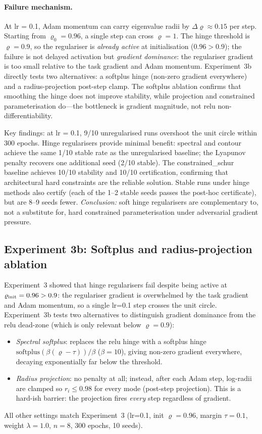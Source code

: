 \documentclass{article}
\theoremstyle{definition}
\begin{document}
\paragraph{Failure mechanism.}
At lr = 0.1, Adam momentum can carry eigenvalue radii by
$\Delta\varrho \approx 0.15$ per step.
Starting from $\varrho_0 = 0.96$, a single step can cross $\varrho = 1$.
The hinge threshold is $\varrho = 0.9$, so the regulariser is
\emph{already active} at initialisation ($0.96 > 0.9$); the failure is
not delayed activation but \emph{gradient dominance}: the regulariser
gradient is too small relative to the task gradient and Adam momentum.
Experiment~3b directly tests two alternatives: a softplus hinge
(non-zero gradient everywhere) and a radius-projection post-step clamp.
The softplus ablation confirms that smoothing the hinge does not improve
stability, while projection and constrained parameterisation do---the
bottleneck is gradient magnitude, not relu non-differentiability.

Key findings: at lr = 0.1, 9/10 unregularised runs overshoot the unit
circle within 300 epochs.  Hinge regularisers provide minimal benefit:
spectral and contour achieve the same 1/10 stable rate as the
unregularised baseline; the Lyapunov penalty recovers one additional
seed (2/10 stable).  The constrained\_schur baseline achieves 10/10
stability and 10/10 certification, confirming that architectural hard
constraints are the reliable solution.  Stable runs under hinge methods
also certify (each of the 1--2 stable seeds passes the post-hoc
certificate), but are 8--9 seeds fewer.
\emph{Conclusion:} soft hinge regularisers are complementary to, not a
substitute for, hard constrained parameterisation under adversarial
gradient pressure.

\subsection{Experiment 3b: Softplus and radius-projection ablation}
\label{sec:exp3b}

Experiment~3 showed that hinge regularisers fail despite being active at
$\varrho_{\rm init}=0.96>0.9$: the regulariser gradient is overwhelmed by
the task gradient and Adam momentum, so a single lr=0.1 step crosses the
unit circle.  Experiment~3b tests two alternatives to distinguish gradient
dominance from the relu dead-zone (which is only relevant below $\varrho=0.9$):
\begin{itemize}
\item \emph{Spectral softplus}: replaces the relu hinge with a softplus
  hinge $\mathrm{softplus}(\beta(\varrho - \tau))/\beta$ ($\beta=10$),
  giving non-zero gradient everywhere, decaying exponentially far below
  the threshold.
\item \emph{Radius projection}: no penalty at all; instead, after each
  Adam step, log-radii are clamped so $r_i \leq 0.98$ for every mode
  (post-step projection).  This is a hard-ish barrier: the projection
  fires \emph{every} step regardless of gradient.
\end{itemize}
All other settings match Experiment~3 (lr=0.1, init $\varrho=0.96$,
margin $\tau=0.1$, weight $\lambda=1.0$, $n=8$, 300 epochs, 10 seeds).
\end{document}
